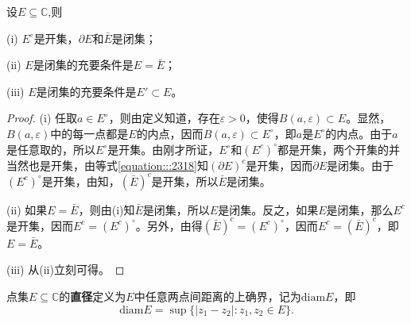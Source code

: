 \documentclass[../../main.tex]{subfiles}%
\begin{document}
\begin{proposition}\label{proposition:开集,闭集的充要条件}
设$E\subseteq \mathbb{C}$,则

(i) \(E^\circ\)是开集，\(\partial E\)和\(\bar{E}\)是闭集；

(ii) \(E\)是闭集的充要条件是\(E = \bar{E}\)；

(iii) \(E\)是闭集的充要条件是\(E' \subset E\)。
\end{proposition}
\begin{proof}

(i) 任取\(a \in E^\circ\)，则由定义知道，存在\(\varepsilon > 0\)，使得\(B(a, \varepsilon) \subset E\)。显然，\(B(a, \varepsilon)\)中的每一点都是\(E\)的内点，因而\(B(a, \varepsilon) \subset E^\circ\)，即\(a\)是\(E^\circ\)的内点。由于\(a\)是任意取的，所以\(E^\circ\)是开集。由刚才所证，\(E^\circ\)和\((E^c)^\circ\)都是开集，两个开集的并当然也是开集，由等式\eqref{equation:::2318}知\((\partial E)^c\)是开集，因而\(\partial E\)是闭集。由于\((E^c)^\circ\)是开集，由知，\((\bar{E})^c\)是开集，所以\(\bar{E}\)是闭集。

(ii) 如果\(E = \bar{E}\)，则由(i)知\(\bar{E}\)是闭集，所以\(E\)是闭集。反之，如果\(E\)是闭集，那么\(E^c\)是开集，因而\(E^c = (E^c)^\circ\)。另外，由得\((\bar{E})^c = (E^c)^\circ\)，因而\(E^c = (\bar{E})^c\)，即\(E = \bar{E}\)。

(iii) 从(ii)立刻可得。 

\end{proof}

\begin{definition}
点集\(E\subseteq \mathbb{C}\)的\textbf{直径}定义为\(E\)中任意两点间距离的上确界，记为\(\mathrm{diam}E\)，即
\[
\mathrm{diam}E = \sup\{ | z_1 - z_2 | : z_1, z_2 \in E \}.
\]
\end{definition}
\end{document}
